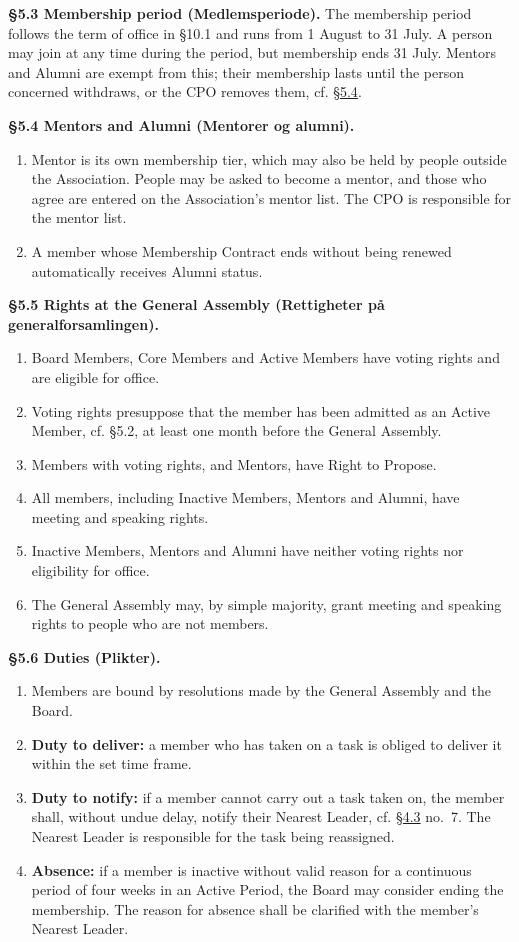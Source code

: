 \documentclass{../../../Common/Latex/Templates/rapport}
\begin{document}
\textbf{\S 5.3 Membership period (Medlemsperiode).}\label{bylaw:5.3} The membership period follows the term of office in \S10.1 and runs from 1 August to 31 July. A person may join at any time during the period, but membership ends 31 July. Mentors and Alumni are exempt from this; their membership lasts until the person concerned withdraws, or the CPO removes them, cf. \hyperref[bylaw:5.4]{\S 5.4}.

\textbf{\S 5.4 Mentors and Alumni (Mentorer og alumni).}\label{bylaw:5.4}
\begin{enumerate}
  \item Mentor is its own membership tier, which may also be held by people outside the Association. People may be asked to become a mentor, and those who agree are entered on the Association's mentor list. The CPO is responsible for the mentor list.
  \item A member whose Membership Contract ends without being renewed automatically receives Alumni status.
\end{enumerate}

\textbf{\S 5.5 Rights at the General Assembly (Rettigheter på generalforsamlingen).}\label{bylaw:5.5}
\begin{enumerate}
  \item Board Members, Core Members and Active Members have voting rights and are eligible for office.
  \item Voting rights presuppose that the member has been admitted as an Active Member, cf. \S5.2, at least one month before the General Assembly.
  \item Members with voting rights, and Mentors, have Right to Propose.
  \item All members, including Inactive Members, Mentors and Alumni, have meeting and speaking rights.
  \item Inactive Members, Mentors and Alumni have neither voting rights nor eligibility for office.
  \item The General Assembly may, by simple majority, grant meeting and speaking rights to people who are not members.
\end{enumerate}

\textbf{\S 5.6 Duties (Plikter).}\label{bylaw:5.6}
\begin{enumerate}
  \item Members are bound by resolutions made by the General Assembly and the Board.
  \item \textbf{Duty to deliver:} a member who has taken on a task is obliged to deliver it within the set time frame.
  \item \textbf{Duty to notify:} if a member cannot carry out a task taken on, the member shall, without undue delay, notify their Nearest Leader, cf. \hyperref[bylaw:4.3]{\S 4.3} no.\ 7. The Nearest Leader is responsible for the task being reassigned.
  \item \textbf{Absence:} if a member is inactive without valid reason for a continuous period of four weeks in an Active Period, the Board may consider ending the membership. The reason for absence shall be clarified with the member's Nearest Leader.
\end{enumerate}
\end{document}
